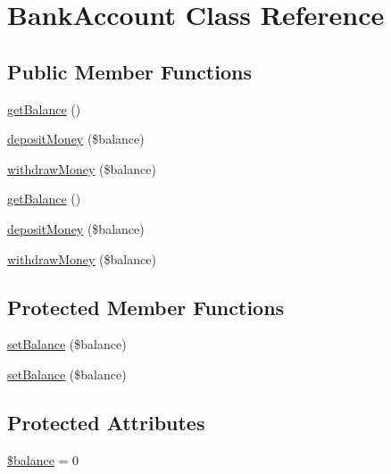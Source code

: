 \hypertarget{class_bank_account}{}\section{Bank\+Account Class Reference}
\label{class_bank_account}
\subsection*{Public Member Functions}
\begin{DoxyCompactItemize}
\item 
\mbox{\hyperlink{class_bank_account_a75cc53ac692897a5cc38b0e92c28cbfb}{get\+Balance}} ()
\item 
\mbox{\hyperlink{class_bank_account_aeb1e8e91e4a2b1543ae0644bd3723777}{deposit\+Money}} (\$balance)
\item 
\mbox{\hyperlink{class_bank_account_af0ad76c7548c448bab3dad3e06ad4aad}{withdraw\+Money}} (\$balance)
\item 
\mbox{\hyperlink{class_bank_account_a75cc53ac692897a5cc38b0e92c28cbfb}{get\+Balance}} ()
\item 
\mbox{\hyperlink{class_bank_account_aeb1e8e91e4a2b1543ae0644bd3723777}{deposit\+Money}} (\$balance)
\item 
\mbox{\hyperlink{class_bank_account_af0ad76c7548c448bab3dad3e06ad4aad}{withdraw\+Money}} (\$balance)
\end{DoxyCompactItemize}
\subsection*{Protected Member Functions}
\begin{DoxyCompactItemize}
\item 
\mbox{\hyperlink{class_bank_account_a5452130e90be0667498a1952343f8f85}{set\+Balance}} (\$balance)
\item 
\mbox{\hyperlink{class_bank_account_a5452130e90be0667498a1952343f8f85}{set\+Balance}} (\$balance)
\end{DoxyCompactItemize}
\subsection*{Protected Attributes}
\begin{DoxyCompactItemize}
\item 
\mbox{\hyperlink{class_bank_account_ac600cdfc056c66926d1b3f5aff7088a9}{\$balance}} = 0
\end{DoxyCompactItemize}


